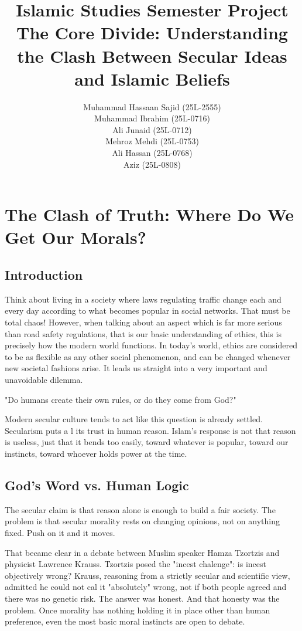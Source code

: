 \documentclass[12pt]{article}
\title{Islamic Studies Semester Project\\
\large The Core Divide: Understanding the Clash Between Secular Ideas and Islamic Beliefs}
\author{
Muhammad Hassaan Sajid (25L-2555)\\
Muhammad Ibrahim (25L-0716)\\
Ali Junaid (25L-0712)\\
Mehroz Mehdi (25L-0753)\\
Ali Hassan (25L-0768)\\
Aziz (25L-0808)
}
\date{}
\begin{document}
\maketitle

\newpage

\newpage
\pagestyle{fancy}
\fancyhf{}
\fancyfoot[C]{\thepage}

\section*{The Clash of Truth: Where Do We Get Our Morals?}

\subsection*{Introduction}

Think about living in a society where laws regulating traffic change each and every day 
according to what becomes popular in social networks. That must be total chaos! However, 
when talking about an aspect which is far more serious than road safety regulations, that is our 
basic understanding of ethics, this is precisely how the modern world functions. In today’s 
world, ethics are considered to be as flexible as any other social phenomenon, and can be 
changed whenever new societal fashions arise. It leads us straight into a very important and 
unavoidable dilemma. 

"Do humans create their own rules, or do they come from God?" 

Modern secular culture tends to act like this question is already settled. Secularism puts a l its 
trust in human reason. Islam's response is not that reason is useless, just that it bends too 
easily, toward whatever is popular, toward our instincts, toward whoever holds power at the 
time. 

\subsection*{God's Word vs. Human Logic}

The secular claim is that reason alone is enough to build a fair society. The problem is that 
secular morality rests on changing opinions, not on anything fixed. Push on it and it moves. 

That became clear in a debate between Muslim speaker Hamza Tzortzis and physicist 
Lawrence Krauss. Tzortzis posed the "incest chalenge": is incest objectively wrong? Krauss, 
reasoning from a strictly secular and scientific view, admitted he could not cal it "absolutely" 
wrong, not if both people agreed and there was no genetic risk. The answer was honest. And 
that honesty was the problem. Once morality has nothing holding it in place other than human 
preference, even the most basic moral instincts are open to debate. 
\end{document}
